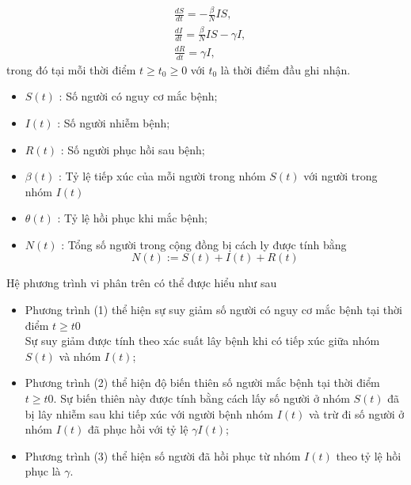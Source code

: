 \documentclass[a4paper]{article}
\begin{document}
\begin{align}
\label{S_derivatie}
&\frac{dS}{dt} = -\frac{\beta}{N}IS,
\\
&\frac{dI}{dt} = \frac{\beta}{N}IS - \gamma I,
\\
&\frac{dR}{dt} = \gamma I, 
\end{align}
\noindent trong đó tại mỗi thời điểm $t \geq t_{0} \geq 0$ với $t_0$ là thời điểm đầu ghi nhận.
\begin{itemize}
\item $S(t)$ : Số người có nguy cơ mắc bệnh;
\item $I(t)$ : Số người nhiễm bệnh;
\item $R(t)$ : Số người phục hồi sau bệnh;
\item $\beta (t)$ : Tỷ lệ tiếp xúc của mỗi người trong nhóm $S(t)$ với người trong nhóm $I(t)$
\item $\theta (t)$ : Tỷ lệ hồi phục khi mắc bệnh;
\item $N(t)$ : Tổng số người trong cộng đồng bị cách ly được tính bằng
\begin{equation}
N(t) := S(t) + I(t) + R(t)
\end{equation}
\end{itemize}
Hệ phương trình vi phân trên có thể được hiểu như sau
\begin{itemize}
\item Phương trình (1) thể hiện sự suy giảm số người có nguy cơ mắc bệnh tại thời điểm $t \geq t0$ \\
Sự suy giảm được tính theo xác suất lây bệnh khi có tiếp xúc giữa nhóm $S(t)$ và nhóm $I(t)$;
\item Phương trình (2) thể hiện độ biến thiên số người mắc bệnh tại thời điểm $t \geq t0$. Sự biến thiên này được tính bằng cách lấy số người ở nhóm $S(t)$ đã bị lây nhiễm sau khi tiếp xúc với người bệnh nhóm $I(t)$ và trừ đi số người ở nhóm $I(t)$ đã phục hồi với tỷ lệ $\gamma I(t)$;
\item Phương trình (3) thể hiện số người đã hồi phục từ nhóm $I(t)$ theo tỷ lệ hồi phục là $\gamma$.
\end{itemize}
\end{document}
